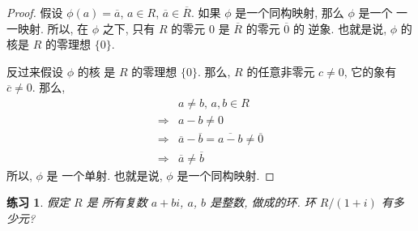 \documentclass[utf8]{ctexbook}
\newtheorem{exercise}{练习}[section]
\begin{document}
\begin{proof}
假设 $\phi(a) = \overline{a}$, $a \in R$, $\overline{a} \in \overline{R}$. 如果 $\phi$ 是一个同构映射, 那么 $\phi$ 是一个 一一映射. 所以, 在 $\phi$ 之下, 只有 $R$ 的零元 $0$ 是 $\overline{R}$ 的零元 $\overline{0}$ 的 逆象. 也就是说, $\phi$ 的核是 $R$ 的零理想 $\{0\}$.

反过来假设 $\phi$ 的核 是 $R$ 的零理想 $\{ 0 \}$. 那么, $R$ 的任意非零元 $c \neq 0$, 它的象有 $\overline{c} \neq 0$. 那么,
\begin{align*}
& a \neq b,\, a, b \in R \\
\Longrightarrow & a - b \neq 0 \\
\Longrightarrow & \overline{a} - \overline{b} = \overline{a - b} \neq \overline{0} \\
\Longrightarrow & \overline{a} \neq \overline{b}
\end{align*}
所以, $\phi$ 是 一个单射. 也就是说, $\phi$ 是一个同构映射.
\end{proof}

\begin{exercise}\label{exercise_quotient_ring_R_1_i}
假定 $R$ 是 所有复数 $a + b i $, $a$, $b$ 是整数, 做成的环. 环 $R/(1+i)$ 有多少元?
\end{exercise}
\end{document}

